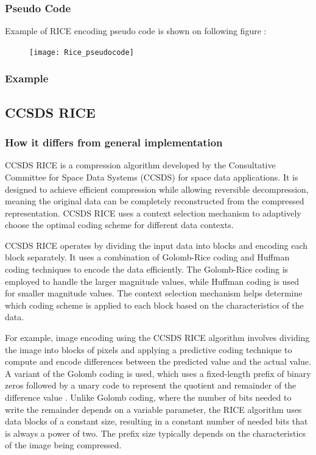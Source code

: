 \documentclass[licencjacka,en]{pracamgr}
\begin{document}
\subsubsection{Pseudo Code}
Example of RICE encoding pseudo code is shown on following figure \cite{golomb-wikipedia}: \\
\begin{figure}[h]
\centering
\texttt{[image: Rice\_pseudocode]}
\end{figure}

\subsubsection{Example}

\subsection{CCSDS RICE}
\subsubsection{How it differs from general implementation}
CCSDS RICE is a compression algorithm developed by the Consultative Committee for Space Data Systems (CCSDS) for space data applications. It is designed to achieve efficient compression while allowing reversible decompression, meaning the original data can be completely reconstructed from the compressed representation. CCSDS RICE uses a context selection mechanism to adaptively choose the optimal coding scheme for different data contexts.

CCSDS RICE operates by dividing the input data into blocks and encoding each block separately. It uses a combination of Golomb-Rice coding and Huffman coding techniques to encode the data efficiently. The Golomb-Rice coding is employed to handle the larger magnitude values, while Huffman coding is used for smaller magnitude values. The context selection mechanism helps determine which coding scheme is applied to each block based on the characteristics of the data.

For example, image encoding using the CCSDS RICE algorithm involves dividing the image into blocks of pixels and applying a predictive coding technique to compute and encode differences between the predicted value and the actual value. A variant of the Golomb coding is used, which uses a fixed-length prefix of binary zeros followed by a unary code to represent the quotient and remainder of the difference value \cite{rice-codes}. Unlike Golomb coding, where the number of bits needed to write the remainder depends on a variable parameter, the RICE algorithm uses data blocks of a constant size, resulting in a constant number of needed bits that is always a power of two. The prefix size typically depends on the characteristics of the image being compressed.
\end{document}
